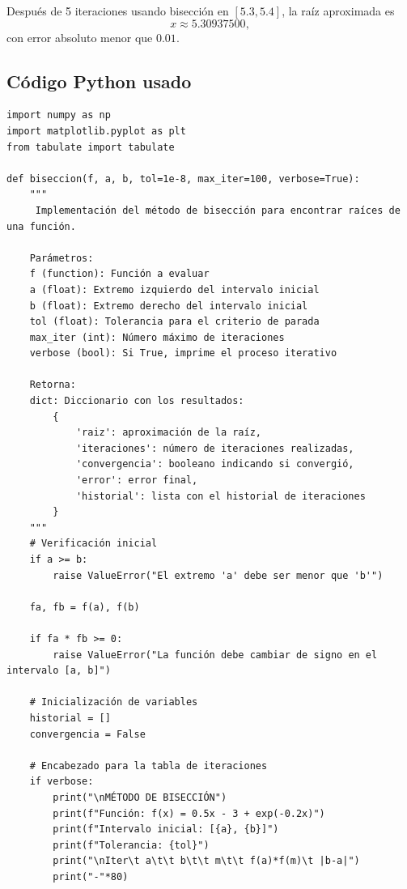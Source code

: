 \documentclass[12pt]{article}
\begin{document}
\begin{center}
Después de 5 iteraciones usando bisección en \([5.3,5.4]\), la raíz aproximada es
\[
\boxed{x \approx 5.30937500},
\]
con error absoluto menor que \(0.01\).



\subsection*{Código Python usado}

\begin{tcolorbox}[title=Codigo python,
                  colback=white,
                  colframe=black,
                  breakable, enhanced]
\begin{lstlisting}[style=mypython]
import numpy as np
import matplotlib.pyplot as plt
from tabulate import tabulate

def biseccion(f, a, b, tol=1e-8, max_iter=100, verbose=True):
    """
     Implementación del método de bisección para encontrar raíces de una función.
    
    Parámetros:
    f (function): Función a evaluar
    a (float): Extremo izquierdo del intervalo inicial
    b (float): Extremo derecho del intervalo inicial
    tol (float): Tolerancia para el criterio de parada
    max_iter (int): Número máximo de iteraciones
    verbose (bool): Si True, imprime el proceso iterativo
    
    Retorna:
    dict: Diccionario con los resultados:
        {
            'raiz': aproximación de la raíz,
            'iteraciones': número de iteraciones realizadas,
            'convergencia': booleano indicando si convergió,
            'error': error final,
            'historial': lista con el historial de iteraciones
        }
    """
    # Verificación inicial
    if a >= b:
        raise ValueError("El extremo 'a' debe ser menor que 'b'")
    
    fa, fb = f(a), f(b)
    
    if fa * fb >= 0:
        raise ValueError("La función debe cambiar de signo en el intervalo [a, b]")
    
    # Inicialización de variables
    historial = []
    convergencia = False
    
    # Encabezado para la tabla de iteraciones
    if verbose:
        print("\nMÉTODO DE BISECCIÓN")
        print(f"Función: f(x) = 0.5x - 3 + exp(-0.2x)")
        print(f"Intervalo inicial: [{a}, {b}]")
        print(f"Tolerancia: {tol}")
        print("\nIter\t a\t\t b\t\t m\t\t f(a)*f(m)\t |b-a|")
        print("-"*80)
    

\end{lstlisting}
\end{tcolorbox}
\end{center}
\end{document}
